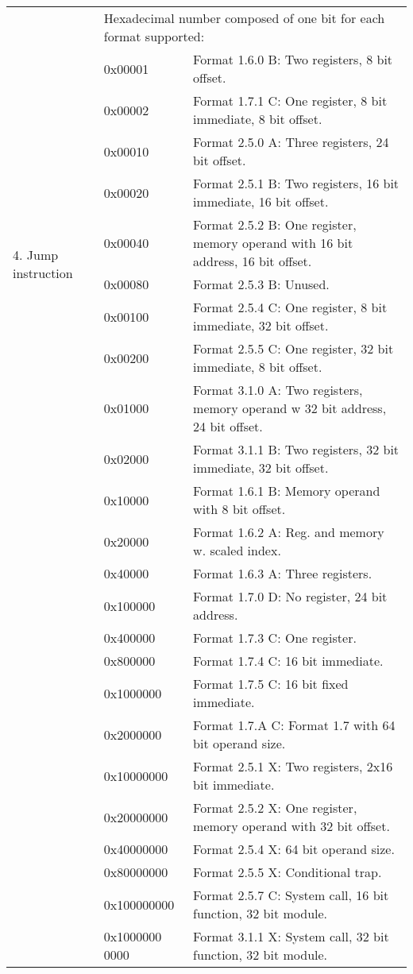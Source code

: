 \documentclass[forwardcom.tex]{subfiles}
\begin{document}
\begin{longtable} {|p{18mm}|p{20mm} p{80mm}|}
\multirow{12}{*}{\parbox[t]{18mm}{4. Jump instruction}} 
  &  \multicolumn{2}{|l|}{
     Hexadecimal number composed of one bit for each format supported:} \\
  &  0x00001 & Format 1.6.0 B: Two registers, 8 bit offset. \\
  &  0x00002 & Format 1.7.1 C: One register, 8 bit immediate, 8 bit offset. \\
  &  0x00010 & Format 2.5.0 A: Three registers, 24 bit offset. \\
  &  0x00020 & Format 2.5.1 B: Two registers, 16 bit immediate, 16 bit offset. \\
  &  0x00040 & Format 2.5.2 B: One register, memory operand with 16 bit address, 16 bit  offset. \\
  &  0x00080 & Format 2.5.3 B: Unused. \\
  &  0x00100 & Format 2.5.4 C: One register, 8 bit immediate, 32 bit offset. \\
  &  0x00200 & Format 2.5.5 C: One register, 32 bit immediate, 8 bit offset. \\  
  &  0x01000 & Format 3.1.0 A: Two registers, memory operand w 32 bit address, 24 bit offset. \\
  &  0x02000 & Format 3.1.1 B: Two registers, 32 bit immediate, 32 bit offset. \\  
  &  0x10000 & Format 1.6.1 B: Memory operand with 8 bit offset. \\
  &  0x20000 & Format 1.6.2 A: Reg. and memory w. scaled index. \\
  &  0x40000 & Format 1.6.3 A: Three registers. \\  
  &  0x100000 & Format 1.7.0 D: No register, 24 bit address. \\  
  &  0x400000 & Format 1.7.3 C: One register. \\
  &  0x800000 & Format 1.7.4 C: 16 bit immediate. \\
  &  0x1000000 & Format 1.7.5 C: 16 bit fixed immediate. \\
  &  0x2000000 & Format 1.7.A C: Format 1.7 with 64 bit operand size. \\
  &  0x10000000 & Format 2.5.1 X: Two registers, 2x16 bit immediate. \\
  &  0x20000000 & Format 2.5.2 X: One register, memory operand with 32 bit offset. \\
  &  0x40000000 & Format 2.5.4 X: 64 bit operand size. \\  
  &  0x80000000 & Format 2.5.5 X: Conditional trap. \\
  &  0x100000000 & Format 2.5.7 C: System call, 16 bit function, 32 bit module. \\
  & 0x1000000 0000 & Format 3.1.1 X: System call, 32 bit function, 32 bit module. \\
\hline
\end{longtable}
\end{document}
